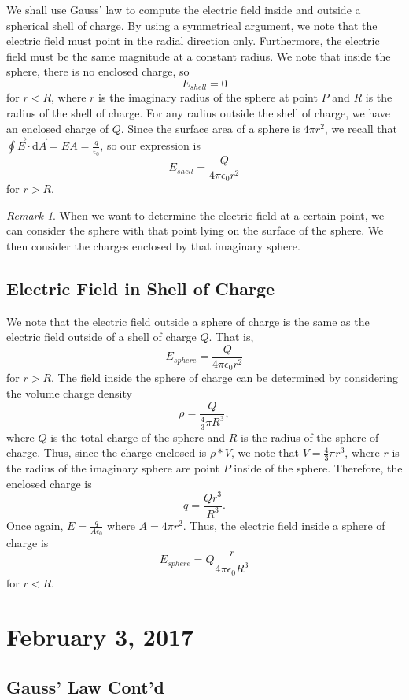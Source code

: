 \documentclass[11pt]{article}
\theoremstyle{plain} %
\theoremstyle{definition}
\theoremstyle{example}
\theoremstyle{remark}
\newtheorem*{remark}{Remark}
\begin{document}
We shall use Gauss' law to compute the electric field inside and outside a spherical shell of charge. By using a symmetrical argument, we note that the electric field must point in the radial direction only. Furthermore, the electric field must be the same magnitude at a constant radius. We note that inside the sphere, there is no enclosed charge, so 
$$E_{shell}=0$$
for $r<R$, where $r$ is the imaginary radius of the sphere at point $P$ and $R$ is the radius of the shell of charge. For any radius outside the shell of charge, we have an enclosed charge of $Q$. Since the surface area of a sphere is $4\pi r^2$, we recall that $\oint\vec{E} \cdot \mathrm d \vec{A} = EA = \frac{q}{\epsilon_0}$, so our expression is 
$$E_{shell} = \frac{Q}{4\pi\epsilon_0r^2}$$
for $r>R$.
\begin{remark}
When we want to determine the electric field at a certain point, we can consider the sphere with that point lying on the surface of the sphere. We then consider the charges enclosed by that imaginary sphere. 
\end{remark}

\subsection{Electric Field in Shell of Charge}

We note that the electric field outside a sphere of charge is the same as the electric field outside of a shell of charge $Q$. That is, 
$$E_{sphere} = \frac{Q}{4\pi\epsilon_0r^2}$$
for $r>R$. The field inside the sphere of charge can be determined by considering the volume charge density $$\rho = \frac{Q}{\frac{4}{3}\pi R^3},$$
where $Q$ is the total charge of the sphere and $R$ is the radius of the sphere of charge. Thus, since the charge enclosed is $\rho*V$, we note that $V = \frac{4}{3}\pi r^3$, where $r$ is the radius of the imaginary sphere are point $P$ inside of the sphere. Therefore, the enclosed charge is 
$$q = \frac{Qr^3}{R^3}.$$ Once again, $E = \frac{q}{A\epsilon_0}$ where $A = 4\pi r^2$. Thus, the electric field inside a sphere of charge is 
$$E_{sphere} = Q\frac{r}{4\pi \epsilon_0R^3}$$
for $r<R$.

\section{February 3, 2017}
\subsection{Gauss' Law Cont'd}
\end{document}
